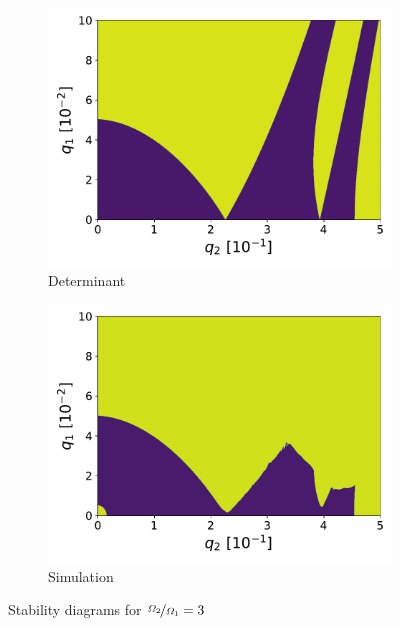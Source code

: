 \begin{figure}[H]
\begin{subfigure}{.5\textwidth}
  \centering
  \includegraphics[width=\linewidth]{img/det_q1_0.0-0.1_q2_0.0-0.5_990x990_3.pdf}
  \caption{Determinant}
  \label{fig:det_3}
\end{subfigure}%
\begin{subfigure}{.5\textwidth}
  \centering
  \includegraphics[width=\linewidth]{img/0_ions_1_electrons_q1_0.0-0.1_q2_0.0-0.5_960x960_3.pdf}  
  \caption{Simulation}
  \label{fig:sim_3}
\end{subfigure}
\caption{Stability diagrams for $\nicefrac{\Omega_2}{\Omega_1} = 3$}
\label{fig:stabil-eta=3}
\end{figure}

